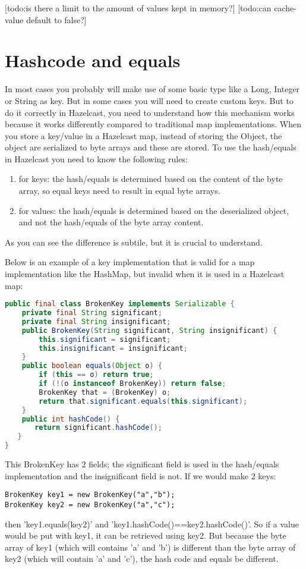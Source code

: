 [todo:is there a limit to the amount of values kept in memory?]
[todo:can cache-value default to false?]

\section{Hashcode and equals}
In most cases you probably will make use of some basic type like a Long, Integer or String as key. But in some cases you will need to create custom keys. But to do it correctly in Hazelcast, you need to understand how this mechanism works because it works differently compared to traditional map implementations. When you store a key/value in a Hazelcast map, instead of storing the Object, the object are serialized to byte arrays and these are stored. To use the hash/equals in Hazelcast you need to know the following rules:
\begin{enumerate}
\item for keys: the hash/equals is determined based on the content of the byte array, so equal keys need to result in equal byte arrays.
\item for values: the hash/equals is determined based on the deserialized object, and not the hash/equals of the byte array content. 
\end{enumerate}
As you can see the difference is subtile, but it is crucial to understand.

Below is an example of a key implementation that is valid for a map implementation like the HashMap, but invalid when it is used in a Hazelcast map:
\begin{lstlisting}[language=java]
public final class BrokenKey implements Serializable {
    private final String significant;
    private final String insignificant;
    public BrokenKey(String significant, String insignificant) {
        this.significant = significant;
        this.insignificant = insignificant;
    }
    public boolean equals(Object o) {
        if (this == o) return true;
        if (!(o instanceof BrokenKey)) return false;
        BrokenKey that = (BrokenKey) o;
        return that.significant.equals(this.significant);
    }
    public int hashCode() {
       return significant.hashCode();
   }
}
\end{lstlisting}
This BrokenKey has 2 fields; the significant field is used in the hash/equals implementation and the insignificant field is not. If we would make 2 keys:
\begin{lstlisting}
BrokenKey key1 = new BrokenKey("a","b");
BrokenKey key2 = new BrokenKey("a","c");
\end{lstlisting} 
then 'key1.equals(key2)' and 'key1.hashCode()==key2.hashCode()'. So if a value would be put with key1, it can be retrieved using key2. But because the byte array of key1 (which will contains 'a' and 'b') is different than the byte array of key2 (which will contain 'a' and 'c'), the hash code and equals be different. 

